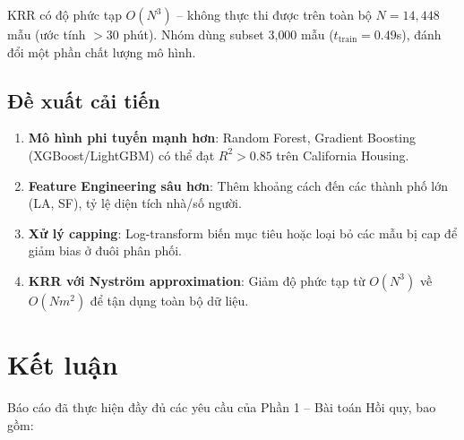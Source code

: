 \documentclass[12pt,a4paper]{article}
\begin{document}
KRR có độ phức tạp $O(N^3)$ -- không thực thi được trên toàn bộ
$N = 14{,}448$ mẫu (ước tính $> 30$ phút). Nhóm dùng subset
3{,}000 mẫu ($t_{\text{train}} = 0.49$s), đánh đổi một phần chất
lượng mô hình.

\subsection{Đề xuất cải tiến}

\begin{enumerate}
  \item \textbf{Mô hình phi tuyến mạnh hơn}: Random Forest, Gradient
        Boosting (XGBoost/LightGBM) có thể đạt $R^2 > 0.85$ trên
        California Housing.
  \item \textbf{Feature Engineering sâu hơn}: Thêm khoảng cách đến
        các thành phố lớn (LA, SF), tỷ lệ diện tích nhà/số người.
  \item \textbf{Xử lý capping}: Log-transform biến mục tiêu hoặc
        loại bỏ các mẫu bị cap để giảm bias ở đuôi phân phối.
  \item \textbf{KRR với Nyström approximation}: Giảm độ phức tạp
        từ $O(N^3)$ về $O(Nm^2)$ để tận dụng toàn bộ dữ liệu.
\end{enumerate}

\section{Kết luận}
\label{sec:conclusion}

Báo cáo đã thực hiện đầy đủ các yêu cầu của Phần 1 -- Bài toán Hồi quy,
bao gồm:
\end{document}
